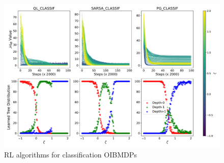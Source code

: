 \begin{figure}
    \centering
    \includegraphics[width=1\textwidth]{images/images_part1/quick_plot_combined_classif.pdf}
    \caption{RL algorithms for classification OIBMDPs}\label{fig:rl-classif-poibmdp}
\end{figure}
